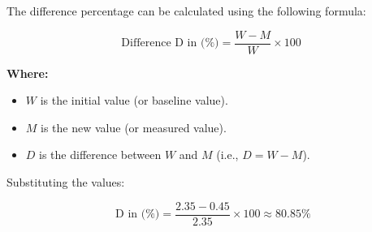 The difference percentage can be calculated using the following formula:

\begin{equation}
\text{Difference D in  (\%)} = \frac{W - M}{W} \times 100
\end{equation}

\noindent \textbf{Where:}
\begin{itemize}
    \item \( W \) is the initial value (or baseline value).
    \item \( M \) is the new value (or measured value).
    \item \( D \) is the difference between \( W \) and \( M \) (i.e., \( D = W - M \)).
\end{itemize}

Substituting the values:

\[
\text{ D in (\%)} = \frac{2.35 - 0.45}{2.35} \times 100 \approx 80.85\%
\]